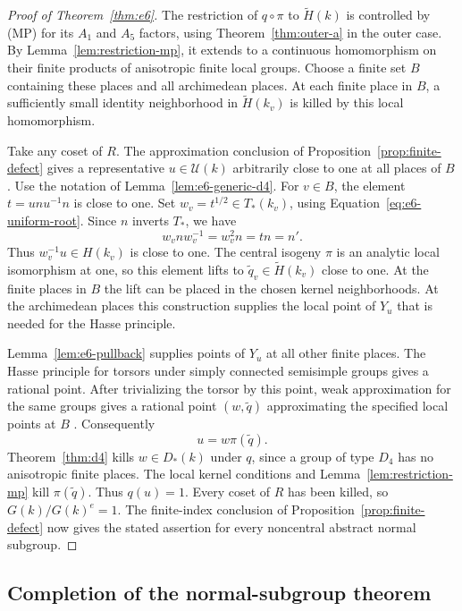\begin{proof}[Proof of Theorem~\ref{thm:e6}]
The restriction of $q\circ\pi$ to $\widetilde H(k)$ is controlled by
(MP) for its $A_1$ and $A_5$ factors, using Theorem~\ref{thm:outer-a} in
the outer case.  By Lemma~\ref{lem:restriction-mp}, it extends to a
continuous homomorphism on their finite products of anisotropic finite
local groups.  Choose a finite set $B$ containing these places and all
archimedean places.  At each finite place in $B$, a sufficiently small
identity neighborhood in $\widetilde H(k_v)$ is killed by this local
homomorphism.

Take any coset of $R$.  The approximation conclusion of
Proposition~\ref{prop:finite-defect} gives a representative
$u\in\mathcal U(k)$ arbitrarily close to one at all places of $B$.
Use the notation of Lemma~\ref{lem:e6-generic-d4}.  For $v\in B$, the
element $t=unu^{-1}n$ is close to one.  Set
$w_v=t^{1/2}\in T_*(k_v)$, using
Equation~\eqref{eq:e6-uniform-root}.  Since $n$ inverts $T_*$, we have
\[
 w_v n w_v^{-1}=w_v^2n=tn=n'.
\]
Thus $w_v^{-1}u\in H(k_v)$ is close to one.  The central isogeny
$\pi$ is an analytic local isomorphism at one, so this element lifts to
$\widetilde q_v\in\widetilde H(k_v)$ close to one.  At the finite
places in $B$ the lift can be placed in the chosen kernel neighborhoods.
At the archimedean places this construction supplies the local point of
$Y_u$ that is needed for the Hasse principle.

Lemma~\ref{lem:e6-pullback} supplies points of $Y_u$ at all other finite
places.  The Hasse principle for torsors under simply connected
semisimple groups gives a rational point.  After trivializing the torsor
by this point, weak approximation for the same groups gives a rational
point $(w,\widetilde q)$ approximating the specified local points at $B$
\cite{PRbook}.  Consequently
\[
                         u=w\pi(\widetilde q).
\]
Theorem~\ref{thm:d4} kills $w\in D_*(k)$ under $q$, since a group of type
$D_4$ has no anisotropic finite places.  The local kernel conditions and
Lemma~\ref{lem:restriction-mp} kill $\pi(\widetilde q)$.  Thus $q(u)=1$.
Every coset of $R$ has been killed, so $G(k)/G(k)^e=1$.  The finite-index
conclusion of Proposition~\ref{prop:finite-defect} now gives the stated
assertion for every noncentral abstract normal subgroup.
\end{proof}

\subsection{Completion of the normal-subgroup theorem}

